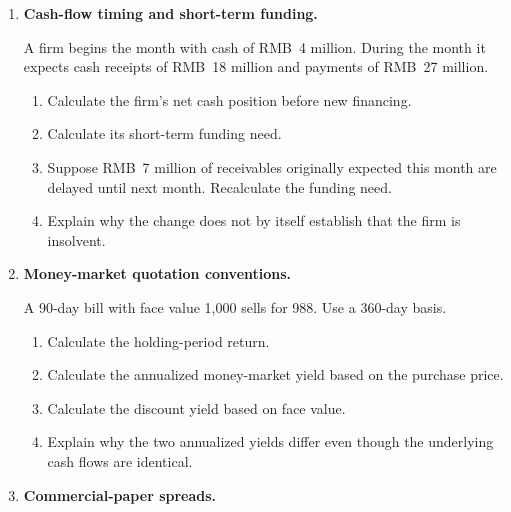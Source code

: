 

\begin{enumerate}

\item \textbf{Cash-flow timing and short-term funding.}

A firm begins the month with cash of RMB~4 million. During the month it expects cash receipts of RMB~18 million and payments of RMB~27 million.

\begin{enumerate}

\item Calculate the firm's net cash position before new financing.

\item Calculate its short-term funding need.

\item Suppose RMB~7 million of receivables originally expected this month are delayed until next month. Recalculate the funding need.

\item Explain why the change does not by itself establish that the firm is insolvent.

\end{enumerate}

\item \textbf{Money-market quotation conventions.}

A 90-day bill with face value 1,000 sells for 988. Use a 360-day basis.

\begin{enumerate}

\item Calculate the holding-period return.

\item Calculate the annualized money-market yield based on the purchase price.

\item Calculate the discount yield based on face value.

\item Explain why the two annualized yields differ even though the underlying cash flows are identical.

\end{enumerate}

\item \textbf{Commercial-paper spreads.}


\end{enumerate}
